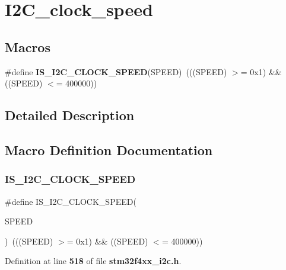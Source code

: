 \section{I2\+C\+\_\+clock\+\_\+speed}
\label{group__I2C__clock__speed}
\subsection*{Macros}
\begin{DoxyCompactItemize}
\item 
\#define \textbf{ I\+S\+\_\+\+I2\+C\+\_\+\+C\+L\+O\+C\+K\+\_\+\+S\+P\+E\+ED}(S\+P\+E\+ED)~(((S\+P\+E\+ED) $>$= 0x1) \&\& ((\+S\+P\+E\+E\+D) $<$= 400000))
\end{DoxyCompactItemize}


\subsection{Detailed Description}


\subsection{Macro Definition Documentation}
\mbox{\label{group__I2C__clock__speed_gae0d731df1b264d853703716c29309b9b}} 
\subsubsection{I\+S\+\_\+\+I2\+C\+\_\+\+C\+L\+O\+C\+K\+\_\+\+S\+P\+E\+ED}
{\footnotesize\ttfamily \#define I\+S\+\_\+\+I2\+C\+\_\+\+C\+L\+O\+C\+K\+\_\+\+S\+P\+E\+ED(\begin{DoxyParamCaption}\item[{}]{S\+P\+E\+ED }\end{DoxyParamCaption})~(((S\+P\+E\+ED) $>$= 0x1) \&\& ((\+S\+P\+E\+E\+D) $<$= 400000))}



Definition at line \textbf{ 518} of file \textbf{ stm32f4xx\+\_\+i2c.\+h}.

